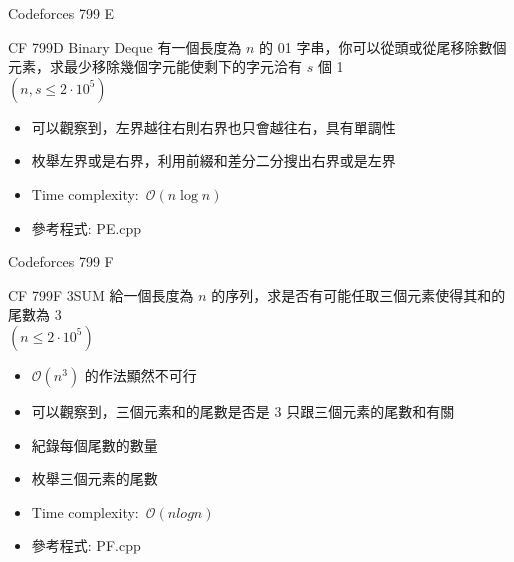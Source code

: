 \documentclass[aspectratio=169]{beamer}
\begin{document}
    \begin{frame}{Codeforces 799 E}
    	\begin{block}{CF 799D Binary Deque}
    		有一個長度為 $n$ 的 01 字串，你可以從頭或從尾移除數個元素，求最少移除幾個字元能使剩下的字元洽有 $s$ 個 1\\
    		$(n, s \le 2 \cdot 10^5)$
    	\end{block}
    	
		\begin{itemize}
			\item 可以觀察到，左界越往右則右界也只會越往右，具有單調性
			\item 枚舉左界或是右界，利用前綴和差分二分搜出右界或是左界
			\item Time complexity:\ $\mathcal{O}(n\log n)$
			\item 參考程式: PE.cpp
		\end{itemize}		    	
    \end{frame}
    
    \begin{frame}{Codeforces 799 F}
		\begin{block}{CF 799F 3SUM}
			給一個長度為 $n$ 的序列，求是否有可能任取三個元素使得其和的尾數為 $3$\\
			$(n \le 2 \cdot 10^5)$
		\end{block}		    
    
    		\begin{itemize}
    			\item $\mathcal{O}(n^3)$ 的作法顯然不可行
    			\item 可以觀察到，三個元素和的尾數是否是 $3$ 只跟三個元素的尾數和有關
    			\item 紀錄每個尾數的數量
    			\item 枚舉三個元素的尾數
    			\item Time complexity:\ $\mathcal{O}(nlogn)$
    			\item 參考程式: PF.cpp
    		\end{itemize}
    \end{frame}
    
\end{document}
